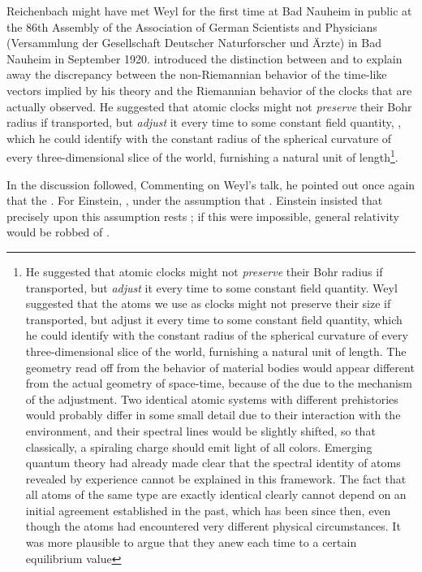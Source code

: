 \documentclass[draft]{article}
\begin{document}
Reichenbach might have met Weyl for the first time at Bad Nauheim in public  at the 86th Assembly of the Association of German Scientists and Physicians (Versammlung der Gesellschaft Deutscher Naturforscher und Ärzte) in Bad Nauheim in September 1920. \citet{Weyl1920a} introduced the distinction between  and  to explain away the discrepancy between the non-Riemannian behavior of the  time-like vectors implied by his theory and the Riemannian behavior of the  clocks that are actually observed. He suggested that atomic clocks might not \emph{preserve} their Bohr radius if transported, but \emph{adjust} it every time to some constant field quantity, , which he could identify with the constant radius of the spherical curvature of every three-dimensional slice of the world, furnishing a natural unit of length\footnote{He suggested that atomic clocks might not \emph{preserve} their Bohr radius if transported, but \emph{adjust} it every time to some constant field quantity. Weyl suggested that the atoms we use as clocks might not preserve their size if transported, but adjust it every time to some constant field quantity, which he could identify with the constant radius of the spherical curvature of every three-dimensional slice of the world, furnishing a natural unit of length. The geometry read off from the behavior of material bodies would appear different from the actual geometry of space-time, because of the  due to the mechanism of the adjustment. Two identical  atomic systems with different prehistories would probably differ in some small detail due to their interaction with the environment, and their spectral lines would be slightly shifted, so that classically, a spiraling charge should emit light of all colors. Emerging quantum theory had already made clear that the spectral identity of atoms revealed by experience cannot be explained in this framework. The fact that all atoms of the same type are exactly identical clearly cannot depend on an initial agreement established in the past, which has been  since then, even though the atoms had encountered very different physical circumstances. It was more plausible to argue that they  anew each time to a certain equilibrium value}. 

In the discussion followed, Commenting on Weyl's talk, he pointed out once again that the   \citep[650]{Einstein1920c}. For Einstein, , under the assumption that  \citep[650]{Einstein1920c}. Einstein insisted that precisely upon this assumption rests ; if this were impossible, general relativity would be robbed of  \citep[650]{Einstein1920c}.
\end{document}
